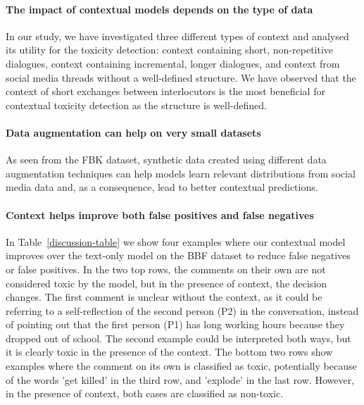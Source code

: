 \documentclass[acmsmall]{acmart}
\begin{document}
\paragraph{\bf The impact of contextual models depends on the type of data} In our study, we have investigated three different types of context and analysed its utility for the toxicity detection: context containing short, non-repetitive dialogues, context containing incremental, longer dialogues, and context from social media threads without a well-defined structure. We have observed that the context of short exchanges between interlocutors is the most beneficial for contextual toxicity detection as the structure is well-defined.

\paragraph{\bf Data augmentation can help on very small datasets} 
As seen from the FBK dataset, synthetic data created using different data augmentation techniques can help models learn relevant distributions from social media data and, as a consequence, lead to better contextual predictions. 

\paragraph{\bf Context helps improve both false positives and false negatives} In Table~\ref{discussion-table} we show four examples where our contextual model improves over the text-only model on the BBF dataset to reduce false negatives or false positives. In the two top rows, the comments on their own are not considered toxic by the model, but in the presence of context, the decision changes. The first comment is unclear without the context, as it could be referring to a self-reflection of the second person (P2) in the conversation, instead of pointing out that the first person (P1) has long working hours because they dropped out of school. The second example could be interpreted both ways, but it is clearly toxic in the presence of the context. The bottom two rows show examples where the comment on its own is classified as toxic, potentially because of the words 'get killed' in the third row, and 'explode' in the last row. However, in the presence of context, both cases are classified as non-toxic.
\end{document}
